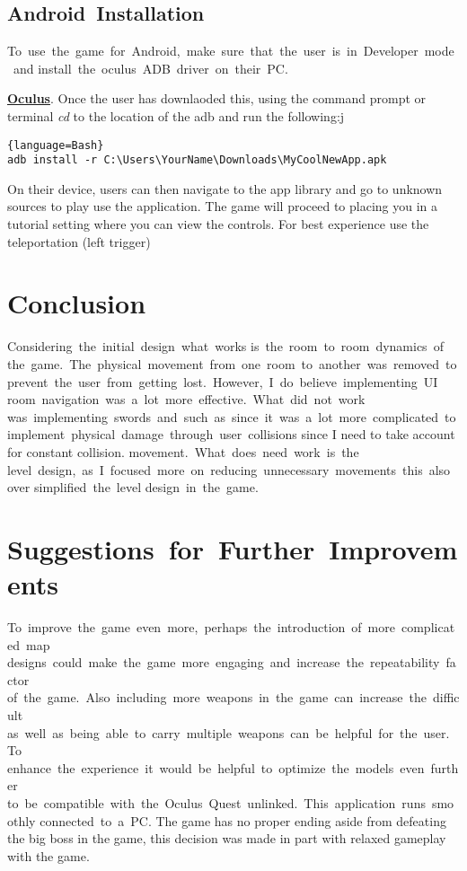 \documentclass[12pt, twoside]{article}
\begin{document}
\subsection{Android Installation}
To use the game for Android, make sure that the user is in Developer mode and
install the oculus ADB driver on their PC.

\textbf{\href{https://developer.oculus.com/downloads/package/oculus-go-adb-drivers/}{Oculus}}.
Once the user has downlaoded this, using the command prompt or terminal
\emph{cd} to the location of the adb and run the following:j
\begin{lstlisting}{language=Bash}
adb install -r C:\Users\YourName\Downloads\MyCoolNewApp.apk
\end{lstlisting}
On their device, users can then navigate to the app library and go to unknown
sources to play use the application. The game will proceed to placing you in a
tutorial setting where you can view the controls. For best experience use the
teleportation (left trigger)

\section{Conclusion}
Considering the initial design what works is the room to room dynamics of
the game. The physical movement from one room to another was removed to
prevent the user from getting lost. However, I do believe implementing UI
room navigation was a lot more effective. What did not work
was implementing swords and such as since it was a lot more complicated to
implement physical damage through user collisions since I need to take account
for constant collision. movement. What does need work is the
level design, as I focused more on reducing unnecessary movements this also over
simplified the level design in the game.\par

\section{Suggestions for Further Improvements}
To improve the game even more, perhaps the introduction of more complicated map
designs could make the game more engaging and increase the repeatability factor
of the game. Also including more weapons in the game can increase the difficult
as well as being able to carry multiple weapons can be helpful for the user. To
enhance the experience it would be helpful to optimize the models even further
to be compatible with the Oculus Quest unlinked. This application runs smoothly
connected to a PC. The game has no proper ending aside from defeating the big
boss in the game, this decision was made in part with relaxed gameplay with the
game.\par
\newpage
\appendix
\end{document}
